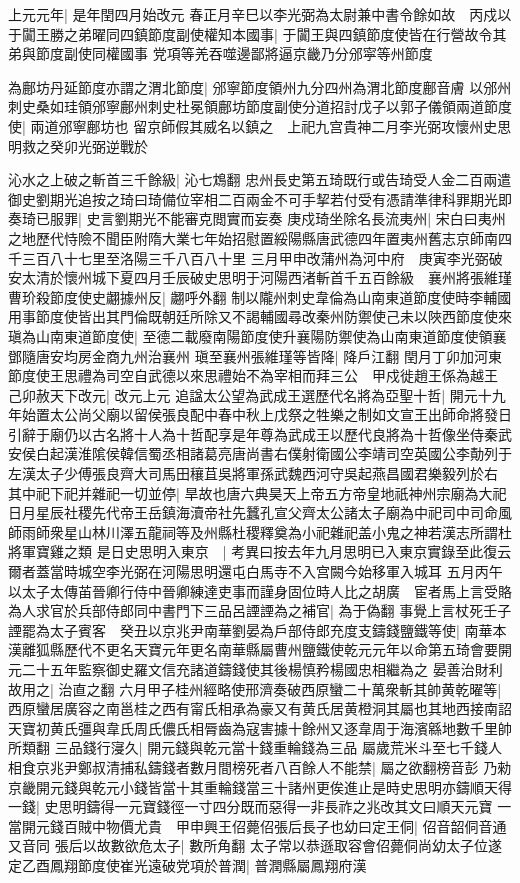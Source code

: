 上元元年|{
	是年閏四月始改元}
春正月辛巳以李光弼為太尉兼中書令餘如故　丙戍以于闐王勝之弟曜同四鎮節度副使權知本國事|{
	于闐王與四鎮節度使皆在行營故令其弟與節度副使同權國事}
党項等羌吞噬邊鄙將逼京畿乃分邠寜等州節度

為鄜坊丹延節度亦謂之渭北節度|{
	邠寧節度領州九分四州為渭北節度鄜音膚}
以邠州刺史桑如珪領邠寧鄜州刺史杜冕領鄜坊節度副使分道招討戊子以郭子儀領兩道節度使|{
	兩道邠寧鄜坊也}
留京師假其威名以鎮之　上祀九宫貴神二月李光弼攻懷州史思明救之癸卯光弼逆戰於

沁水之上破之斬首三千餘級|{
	沁七鴆翻}
忠州長史第五琦既行或告琦受人金二百兩遣御史劉期光追按之琦曰琦備位宰相二百兩金不可手挈若付受有憑請準律科罪期光即奏琦已服罪|{
	史言劉期光不能審克閲實而妄奏}
庚戍琦坐除名長流夷州|{
	宋白曰夷州之地歷代恃險不聞臣附隋大業七年始招慰置綏陽縣唐武德四年置夷州舊志京師南四千三百八十七里至洛陽三千八百八十里}
三月甲申改蒲州為河中府　庚寅李光弼破安太清於懷州城下夏四月壬辰破史思明于河陽西渚斬首千五百餘級　襄州將張維瑾曹玠殺節度使史翽據州反|{
	翽呼外翻}
制以隴州刺史韋倫為山南東道節度使時李輔國用事節度使皆出其門倫既朝廷所除又不謁輔國尋改秦州防禦使己未以陜西節度使來瑱為山南東道節度使|{
	至德二載廢南陽節度使升襄陽防禦使為山南東道節度使領襄鄧隨唐安均房金商九州治襄州}
瑱至襄州張維瑾等皆降|{
	降戶江翻}
閏月丁卯加河東節度使王思禮為司空自武德以來思禮始不為宰相而拜三公　甲戍徙趙王係為越王　己卯赦天下改元|{
	改元上元}
追諡太公望為武成王選歷代名將為亞聖十哲|{
	開元十九年始置太公尚父廟以留侯張良配中春中秋上戊祭之牲樂之制如文宣王出師命將發日引辭于廟仍以古名將十人為十哲配享是年尊為武成王以歷代良將為十哲像坐侍秦武安侯白起漢淮隂侯韓信蜀丞相諸葛亮唐尚書右僕射衛國公李靖司空英國公李勣列于左漢太子少傅張良齊大司馬田穰苴吳將軍孫武魏西河守吳起燕昌國君樂毅列於右}
其中祀下祀并雜祀一切並停|{
	旱故也唐六典昊天上帝五方帝皇地祇神州宗廟為大祀日月星辰社稷先代帝王岳鎮海瀆帝社先蠶孔宣父齊太公諸太子廟為中祀司中司命風師雨師衆星山林川澤五龍祠等及州縣杜稷釋奠為小祀雜祀盖小鬼之神若漢志所謂杜將軍寶雞之類}
是日史思明入東京　|{
	考異曰按去年九月思明已入東京實錄至此復云爾者蓋當時城空李光弼在河陽思明還屯白馬寺不入宫闕今始移軍入城耳}
五月丙午以太子太傳苖晉卿行侍中晉卿練達吏事而謹身固位時人比之胡廣　宦者馬上言受賂為人求官於兵部侍郎同中書門下三品呂諲諲為之補官|{
	為于偽翻}
事覺上言杖死壬子諲罷為太子賓客　癸丑以京兆尹南華劉晏為戶部侍郎充度支鑄錢鹽鐵等使|{
	南華本漢離狐縣歷代不更名天寶元年更名南華縣屬曹州鹽鐵使乾元元年以命第五琦會要開元二十五年監察御史羅文信充諸道鑄錢使其後楊慎矜楊國忠相繼為之}
晏善治財利故用之|{
	治直之翻}
六月甲子桂州經略使邢濟奏破西原蠻二十萬衆斬其帥黄乾曜等|{
	西原蠻居廣容之南邕桂之西有甯氏相承為豪又有黄氏居黄橙洞其屬也其地西接南詔天寶初黄氏彊與韋氏周氏儂氏相脣齒為寇害據十餘州又逐韋周于海濱緜地數千里帥所類翻}
三品錢行寖久|{
	開元錢與乾元當十錢重輪錢為三品}
屬歲荒米斗至七千錢人相食京兆尹鄭叔清捕私鑄錢者數月間榜死者八百餘人不能禁|{
	屬之欲翻榜音彭}
乃勑京畿開元錢與乾元小錢皆當十其重輪錢當三十諸州更俟進止是時史思明亦鑄順天得一錢|{
	史思明鑄得一元寶錢徑一寸四分既而惡得一非長祚之兆改其文曰順天元寶}
一當開元錢百賊中物價尤貴　甲申興王佋薨佋張后長子也幼曰定王侗|{
	佋音韶侗音通又音同}
張后以故數欲危太子|{
	數所角翻}
太子常以恭遜取容會佋薨侗尚幼太子位遂定乙酉鳳翔節度使崔光遠破党項於普潤|{
	普潤縣屬鳳翔府漢}



